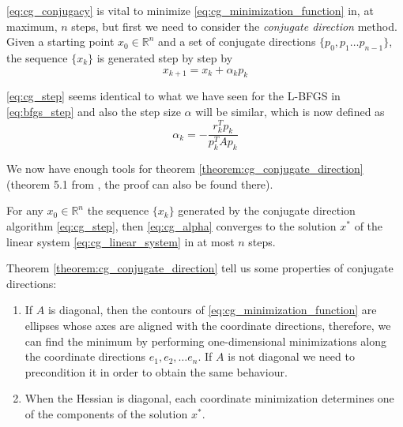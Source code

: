 \noindent \eqref{eq:cg_conjugacy} is vital to minimize \eqref{eq:cg_minimization_function} in, at maximum, $n$ steps, but first we need to consider the \textit{conjugate direction} method. Given a starting point $x_0 \in \mathbb{R}^n$ and a set of conjugate directions $\{ p_0, p_1 \dots p_{n-1}\}$, the sequence $\{ x_k\}$ is generated step by step by
\begin{equation}
    x_{k+1} = x_k + \alpha_kp_k
    \label{eq:cg_step}
\end{equation}

\noindent \eqref{eq:cg_step} seems identical to what we have seen for the L-BFGS in \eqref{eq:bfgs_step} and also the step size $\alpha$ will be similar, which is now defined as
\begin{equation}
    \alpha_k = -\frac{r_k^Tp_k}{p_k^TAp_k}
    \label{eq:cg_alpha}
\end{equation}

\noindent We now have enough tools for theorem \ref{theorem:cg_conjugate_direction} (theorem 5.1 from \cite{nocedal1999numerical}, the proof can also be found there).
\begin{theorem}
    For any $x_0 \in \mathbb{R}^n$ the sequence $\{ x_k\}$ generated by the conjugate direction algorithm \eqref{eq:cg_step}, then \eqref{eq:cg_alpha} converges to the solution $x^*$ of the linear system \eqref{eq:cg_linear_system} in at most $n$ steps.
    \label{theorem:cg_conjugate_direction}
\end{theorem}

\noindent Theorem \ref{theorem:cg_conjugate_direction} tell us some properties of conjugate directions:
\begin{enumerate}
    \item If $A$ is diagonal, then the contours of \eqref{eq:cg_minimization_function} are ellipses whose axes are aligned with the coordinate directions, therefore, we can find the minimum by performing one-dimensional minimizations along the coordinate directions $e_1, e_2, \dots e_n$. If $A$ is not diagonal we need to precondition it in order to obtain the same behaviour.
    \item When the Hessian is diagonal, each coordinate minimization determines one of the components of the solution $x^*$.
\end{enumerate}

